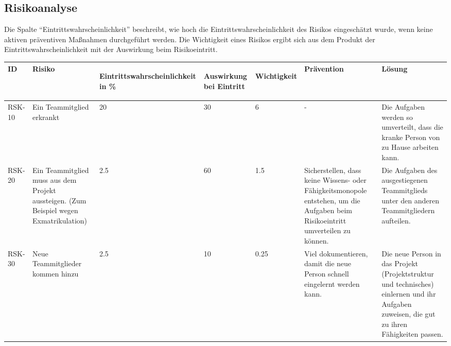 \begin{landscape}

\chapter{Risikoanalyse}
	Die Spalte \enquote{Eintrittswahrscheinlichkeit} beschreibt, wie hoch die Eintrittswahrscheinlichkeit des Risikos eingeschätzt wurde, wenn keine aktiven präventiven Maßnahmen durchgeführt werden.
	Die Wichtigkeit eines Risikos ergibt sich aus dem Produkt der Eintrittswahrscheinlichkeit mit der Auswirkung beim Risikoeintritt.
	\begin{longtable}{|p{1.5cm}|p{4.5cm}|p{0.4cm}|p{0.4cm}|p{0.8cm}|p{4.5cm}|p{4.5cm}|}

		\hline
		\textbf{ID}
			& \textbf{Risiko} 
				& \begin{turn}{90}\textbf{Eintrittswahrscheinlichkeit in \%}\end{turn}
					& \begin{turn}{90}\textbf{Auswirkung bei Eintritt}\end{turn}
						& \begin{turn}{90}\textbf{Wichtigkeit}\end{turn} 
							& \textbf{Prävention} 
								& \textbf{Lösung} 
		\\ \hline

		RSK-10 	& Ein Teammitglied erkrankt
				& 20 	& 30 	& 6 	& - 	& Die Aufgaben werden so umverteilt, dass die kranke Person von zu Hause arbeiten kann. 

		\\ \hline

		RSK-20 	& Ein Teammitglied muss aus dem Projekt aussteigen. (Zum Beispiel wegen Exmatrikulation)
				& 2.5 	& 60 	& 1.5 	& Sicherstellen, dass keine Wissens- oder Fähigkeitsmonopole entstehen, um die Aufgaben beim Risikoeintritt umverteilen zu können.
								& Die Aufgaben des ausgestiegenen Teammitglieds unter den anderen Teammitgliedern aufteilen.

		\\ \hline

		RSK-30 	& Neue Teammitglieder kommen hinzu
				& 2.5 	& 10 	& 0.25 	& Viel dokumentieren, damit die neue Person schnell eingelernt werden kann.
								& Die neue Person in das Projekt (Projektstruktur und technisches) einlernen und ihr Aufgaben zuweisen, die gut zu ihren Fähigkeiten passen.

		\\ \hline


\end{longtable}
\end{landscape}
